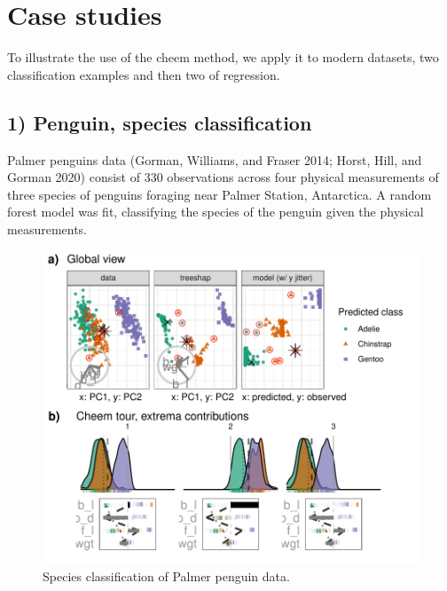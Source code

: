 \documentclass[
  article]{article}
\begin{document}
\hypertarget{sec:casestudies}{%
\section{Case studies}\label{sec:casestudies}}

To illustrate the use of the cheem method, we apply it to modern datasets, two classification examples and then two of regression.

\hypertarget{penguin-species-classification}{%
\subsection{1) Penguin, species classification}\label{penguin-species-classification}}

Palmer penguins data (Gorman, Williams, and Fraser 2014; Horst, Hill, and Gorman 2020) consist of 330 observations across four physical measurements of three species of penguins foraging near Palmer Station, Antarctica. A random forest model was fit, classifying the species of the penguin given the physical measurements.

\begin{figure}

{\centering \includegraphics[width=1\linewidth]{./figures/case_penguins} 

}

\caption{Species classification of Palmer penguin data.}\label{fig:casepenguins}
\end{figure}
\end{document}
